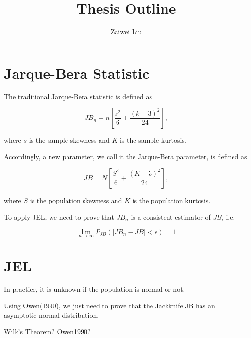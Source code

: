 \documentclass[12pt, oneside]{article}   	%
\title{Thesis Outline}
\author{Zaiwei Liu}
\date{}							%
\begin{document}

\section{Jarque-Bera Statistic}


The traditional Jarque-Bera statistic is defined as

\begin{equation}
{JB}_n=n\left[\frac{s^2}{6}+\frac{(k-3)^2}{24}\right],
\end{equation}

where $s$ is the sample skewness and $K$ is the sample kurtosis.

%

Accordingly, a new parameter, we call it the Jarque-Bera parameter, is defined as

\begin{equation}
JB=N\left[\frac{S^2}{6}+\frac{(K-3)^2}{24}\right],
\end{equation}

where $S$ is the population skewness and $K$ is the population kurtosis.

To apply JEL, we need to prove that ${JB}_n$ is a consistent estimator of $JB$, i.e.

\begin{equation}
\lim_{n \rightarrow \infty}P_{JB}(|{JB}_n-JB|< \epsilon)=1
\end{equation}

\section{JEL}

In practice, it is unknown if the population is normal or not.

Using Owen(1990), we just need to prove that the Jackknife JB has an asymptotic normal distribution.

Wilk’s Theorem?
Owen1990?
\end{document}

